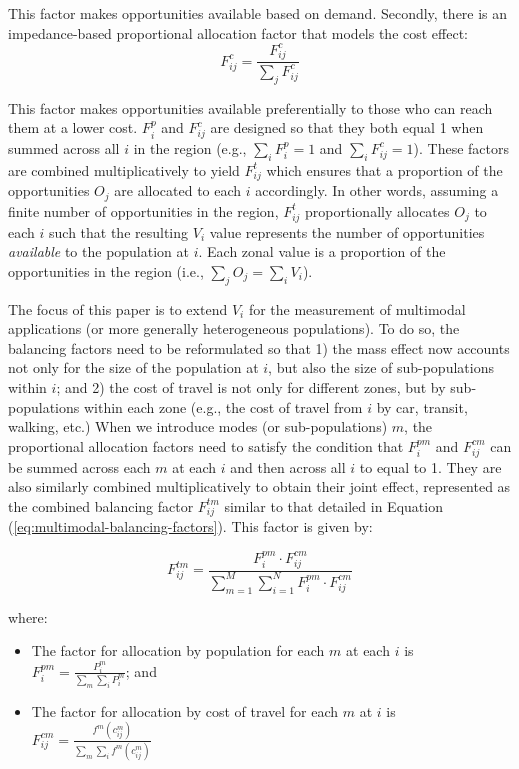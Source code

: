 \documentclass[10pt,letterpaper]{article}
\providecommand{\tightlist}{%
  \setlength{\itemsep}{0pt}\setlength{\parskip}{0pt}}
\begin{document}
This factor makes opportunities available based on demand. Secondly,
there is an impedance-based proportional allocation factor that models
the cost effect: \[
F^c_{ij} = \frac{F^c_{ij}}{\sum_j F^c_{ij}}
\]

This factor makes opportunities available preferentially to those who
can reach them at a lower cost. \(F^p_{i}\) and \(F^c_{ij}\) are
designed so that they both equal 1 when summed across all \(i\) in the
region (e.g., \(\sum_i F^p_{i} = 1\) and \(\sum_i F^c_{ij} = 1\)). These
factors are combined multiplicatively to yield \(F^t_{ij}\) which
ensures that a proportion of the opportunities \(O_j\) are allocated to
each \(i\) accordingly. In other words, assuming a finite number of
opportunities in the region, \(F^t_{ij}\) proportionally allocates
\(O_j\) to each \(i\) such that the resulting \(V_i\) value represents
the number of opportunities \emph{available} to the population at \(i\).
Each zonal value is a proportion of the opportunities in the region
(i.e., \(\sum_j O_j = \sum_i V_i\)).

The focus of this paper is to extend \(V_i\) for the measurement of
multimodal applications (or more generally heterogeneous populations).
To do so, the balancing factors need to be reformulated so that 1) the
mass effect now accounts not only for the size of the population at
\(i\), but also the size of sub-populations within \(i\); and 2) the
cost of travel is not only for different zones, but by sub-populations
within each zone (e.g., the cost of travel from \(i\) by car, transit,
walking, etc.) When we introduce modes (or sub-populations) \(m\), the
proportional allocation factors need to satisfy the condition that
\(F^{pm}_{i}\) and \(F^{cm}_{ij}\) can be summed across each \(m\) at
each \(i\) and then across all \(i\) to equal to 1. They are also
similarly combined multiplicatively to obtain their joint effect,
represented as the combined balancing factor \(F^{tm}_{ij}\) similar to
that detailed in Equation (\ref{eq:multimodal-balancing-factors}). This
factor is given by:

\begin{equation}
\label{eq:multimodal-balancing-factors}
F^{tm}_{ij} = \frac{F^{pm}_{i} \cdot F^{cm}_{ij}}{\sum_{m=1}^M \sum_{i=1}^N F^{pm}_{i} \cdot F^{cm}_{ij}}
\end{equation}

\noindent where:

\begin{itemize}
\tightlist
\item
  The factor for allocation by population for each \(m\) at each \(i\)
  is \(F^{pm}_{i} = \frac{P_{i}^m}{\sum_{m}\sum_{i} P_{i}^m}\); and
\item
  The factor for allocation by cost of travel for each \(m\) at \(i\) is
  \(F_{ij}^{cm} = \frac{f^m(c_{ij}^m)}{\sum_{m} \sum_{i} f^m(c_{ij}^m)}\)
\end{itemize}
\end{document}
